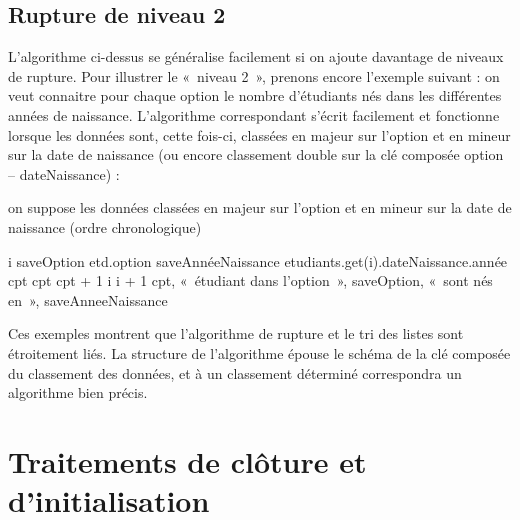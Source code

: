 \subsection*{Rupture de niveau 2}

	L’algorithme ci-dessus se généralise facilement si on ajoute davantage de niveaux de rupture. 
	Pour illustrer le «~niveau 2~», prenons encore l’exemple suivant : 
	on veut connaitre pour chaque option le nombre d’étudiants nés dans les différentes années de naissance. 
	L’algorithme correspondant s’écrit facilement et fonctionne lorsque les données sont, cette fois-ci,
	classées en majeur sur l'option et en mineur sur la date de naissance
	(ou encore classement double sur la clé composée option – dateNaissance) :
	
	\begin{LDA}
		\label{algo:rupt2}
			\LComment on suppose les données classées en majeur sur l’option
			\LComment et en mineur sur la date de naissance (ordre chronologique)
	
			\Let i 
				\Let saveOption \Gets etd.option
					\Let saveAnnéeNaissance \Gets etudiants.get(i).dateNaissance.année
					\Let cpt 
						\Let cpt \Gets cpt + 1
						\Let i \Gets i + 1		
					\EndWhile
					\Write cpt, «~étudiant dans l’option~», saveOption, 
					«~sont nés en~», saveAnneeNaissance
				\EndWhile
			\EndWhile
		\EndAlgo
	\end{LDA}

	Ces exemples montrent que l’algorithme de rupture 
	et le tri des listes sont étroitement liés. 
	La structure de l’algorithme épouse le schéma de la clé composée du classement des données,
	et à un classement déterminé correspondra un algorithme bien précis.

\section{Traitements de clôture et d’initialisation}

